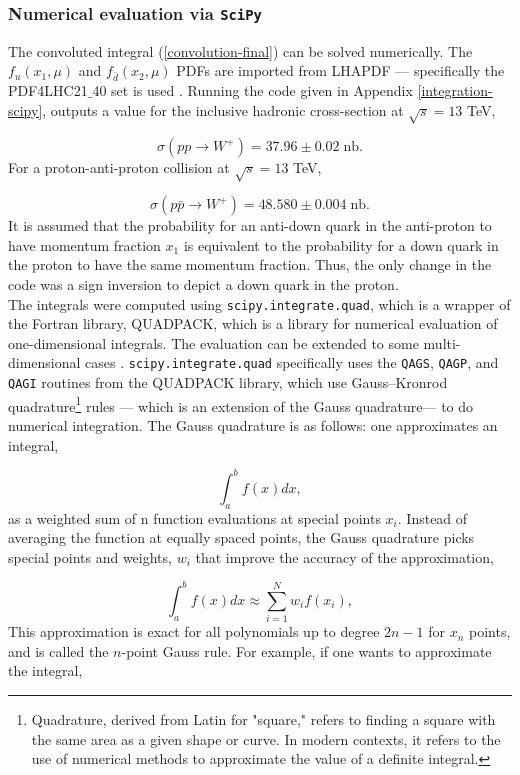 \documentclass[a4paper,11pt]{article}
\begin{document}
\subsubsection{Numerical evaluation via \texttt{SciPy}}\label{numerical-scipy}
The convoluted integral (\ref{convolution-final}) can be solved numerically. The $ f_u(x_1, \mu)$ and $f_{\bar{d}}(x_2,\mu)$ PDFs are imported from LHAPDF --- specifically the PDF4LHC21$\_$40 set is used \cite{PDF4LHCWorkingGroup:2022cjn}. Running the code given in Appendix \ref{integration-scipy}, outputs a value for the inclusive hadronic cross-section at $\sqrt{s} = 13$ TeV,

$$
	\sigma(pp \rightarrow W^+) = 37.96 \pm 0.02\; \text{nb}.
$$
For a proton-anti-proton collision at $\sqrt{s} = 13$ TeV,

$$
\sigma(p\bar{p} \rightarrow W^+) = 48.580 \pm 0.004\; \text{nb}.
$$
It is assumed that the probability for an anti-down quark in the anti-proton to have momentum fraction $x_1$ is equivalent to the probability for a down quark in the proton to have the same momentum fraction. Thus, the only change in the code was a sign inversion to depict a down quark in the proton.\\

The integrals were computed using \texttt{scipy.integrate.quad}, which is a wrapper of the Fortran library, QUADPACK, which is a library for numerical evaluation of one-dimensional integrals. The evaluation can be extended to some multi-dimensional cases \cite{QUADPACKFavati}. \texttt{scipy.integrate.quad} specifically uses the \texttt{QAGS}, \texttt{QAGP}, and \texttt{QAGI} routines from the QUADPACK library, which use Gauss–Kronrod quadrature\footnote{Quadrature, derived from Latin for "square," refers to finding a square with the same area as a given shape or curve. In modern contexts, it refers to the use of numerical methods to approximate the value of a definite integral.} rules --- which is an extension of the Gauss quadrature--- to do numerical integration\cite{QUADPACKwiki}. The Gauss quadrature is as follows: one approximates an integral,

$$\int_a^b f(x) dx,$$
as a weighted sum of n function evaluations at special points $x_i$. Instead of averaging the function at equally spaced points, the Gauss quadrature picks special points and weights, $w_i$ that improve the accuracy of the approximation,

$$\int_a^b f(x) dx \approx \sum_{i =1}^N w_i f(x_i),$$
This approximation is exact for all polynomials up to degree $2n-1$ for $x_n$ points, and is called the $n$-point Gauss rule. For example, if one wants to approximate the integral,
\end{document}
